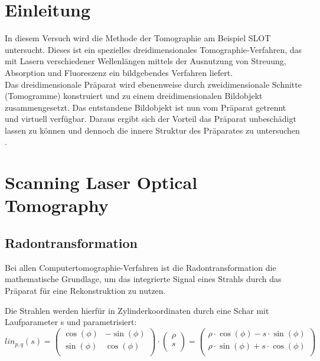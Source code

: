 



\section{Einleitung}
In diesem Versuch wird die Methode der Tomographie am Beispiel SLOT \\ \glqq {} \grqq untersucht. Dieses ist ein spezielles dreidimensionales Tomographie-Verfahren, das mit Lasern verschiedener Wellenlängen mittels der Ausnutzung von Streuung, Absorption und Fluoreszenz ein bildgebendes Verfahren liefert.\\

Das dreidimensionale Präparat wird ebenenweise durch zweidimensionale Schnitte (Tomogramme) konstruiert und zu einem dreidimensionalen Bildobjekt zusammengesetzt. Das entstandene Bildobjekt ist nun vom Präparat getrennt und virtuell verfügbar. Daraus ergibt sich der Vorteil das Präparat unbeschädigt lassen zu können und dennoch die innere Struktur des Präparates zu untersuchen \cite{Anleitung}.\\

\section{Scanning Laser Optical Tomography}

\subsection{Radontransformation}
Bei allen Computertomographie-Verfahren ist die Radontransformation die mathematische Grundlage, um das integrierte Signal eines Strahls durch das Präparat für eine Rekonstruktion zu nutzen.

Die Strahlen werden hierfür in Zylinderkoordinaten durch eine Schar mit Laufparameter s und parametrisiert:
\begin{equation}
lin_{p,q}(s) = \begin{pmatrix}
\cos(\phi) & -\sin(\phi)  \\
\sin(\phi) & \cos(\phi) \\
\end{pmatrix}
\cdot
\begin{pmatrix}
\rho \\
s \\
\end{pmatrix}
 =
\begin{pmatrix}
\rho \cdot \cos(\phi) - s \cdot \sin(\phi) \\
\rho \cdot \sin(\phi) + s \cdot \cos(\phi) \\
\end{pmatrix}
\end{equation}

